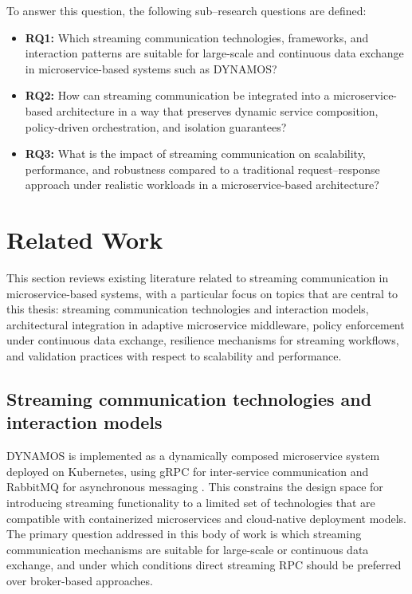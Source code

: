 \documentclass[a4paper,10pt,british]{scrartcl}
\begin{document}
To answer this question, the following sub–research questions are defined:

\begin{itemize}
  \item \textbf{RQ1:} 
  Which streaming communication technologies, frameworks, and interaction patterns are suitable for large-scale and continuous data exchange in microservice-based systems such as DYNAMOS?

  \item \textbf{RQ2:} 
    How can streaming communication be integrated into a microservice-based architecture in a way that preserves dynamic service composition, policy-driven orchestration, and isolation guarantees?

  \item \textbf{RQ3:} 
    What is the impact of streaming communication on scalability, performance, and robustness compared to a traditional request–response approach under realistic workloads in a microservice-based architecture?
\end{itemize}


\section{Related Work}

This section reviews existing literature related to streaming communication in microservice-based systems, with a particular focus on topics that are central to this thesis: streaming communication technologies and interaction models, architectural integration in adaptive microservice middleware, policy enforcement under continuous data exchange, resilience mechanisms for streaming workflows, and validation practices with respect to scalability and performance. 


\subsection{Streaming communication technologies and interaction models}

DYNAMOS is implemented as a dynamically composed microservice system deployed on Kubernetes, using gRPC for inter-service communication and RabbitMQ for asynchronous messaging \cite{stutterheim2023thesis,stutterheim2023icsa}. This constrains the design space for introducing streaming functionality to a limited set of technologies that are compatible with containerized microservices and cloud-native deployment models. The primary question addressed in this body of work is which streaming communication mechanisms are suitable for large-scale or continuous data exchange, and under which conditions direct streaming RPC should be preferred over broker-based approaches.
\end{document}
